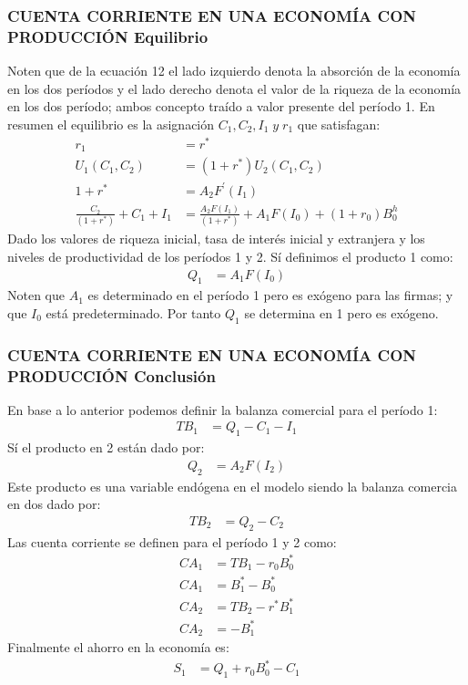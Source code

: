 \documentclass[10pt, xcolor=table, x11names]{beamer}
\begin{document}
\begin{frame}[label=8]
	\frametitle{{\normalsize CUENTA CORRIENTE EN UNA ECONOMÍA CON PRODUCCIÓN } {Equilibrio}}
	Noten que de la ecuación 12 el lado izquierdo denota la absorción de la economía en los dos períodos y el lado derecho denota el valor de la riqueza de la economía en los dos período; ambos concepto traído a valor presente del período 1.
	En resumen el equilibrio es la asignación ${C_{1}, C_{2}, I_{1} \; y\; r_{1}} $ que satisfagan:
	 \begin{align}
	 r_{1}&=r^{*}\nonumber \\
	 U_{1}(C_{1}, C_{2})&=(1+r^{*})U_{2}(C_{1}, C_{2})\nonumber \\
	 1+r^{*}&=A_{2}F^{'}(I_{1})\nonumber \\
	 \frac{C_{2}}{(1+r^{*})}+C_{1}+I_{1}&=\frac{A_{2}F(I_{1})}{(1+r^{*})}+A_{1}F(I_{0})+(1+r_{0})B_{0}^{h}\nonumber
	 \end{align}
Dado los valores de riqueza inicial, tasa de interés inicial y extranjera y los niveles de productividad de los períodos 1 y 2.
Sí definimos el producto 1 como:
\begin{align}
Q_{1}&=A_{1}F(I_{0})\nonumber 
\end{align}
Noten que $A_{1} $ es determinado en el período 1 pero es exógeno para las firmas; y que $I_{0} $ está predeterminado. Por tanto $Q_{1} $ se determina en 1 pero es exógeno. 
\end{frame}

\begin{frame}[label=8]
	\frametitle{{\normalsize CUENTA CORRIENTE EN UNA ECONOMÍA CON PRODUCCIÓN } {Conclusión }}
	En base a lo anterior podemos definir la balanza comercial para el período 1:
	\begin{align}
	TB_{1}&=Q_{1}-C_{1}-I_{1} 
	\end{align}
	Sí el producto en 2 están dado por:
	\begin{align}
	Q_{2}&=A_{2}F(I_{2})\nonumber 
	\end{align}
Este producto es una variable endógena en el modelo siendo la balanza comercia en dos dado por:
\begin{align}
TB_{2}&=Q_{2}-C_{2} 
\end{align}
Las cuenta corriente se definen para el período 1 y 2 como:
\begin{align}
CA_{1}&=TB_{1}-r_{0}B_{0}^{*} \\
CA_{1}&=B_{1}^{*}-B_{0}^{*} \nonumber \\
CA_{2}&=TB_{2}-r^{*}B_{1}^{*} \\
CA_{2}&=-B_{1}^{*} \nonumber
\end{align}
Finalmente el ahorro en la economía es:
\begin{align}
S_{1}&=Q_{1}+r_{0}B_{0}^{*}-C_{1} \\
\end{align}

\end{frame}
\end{document}
